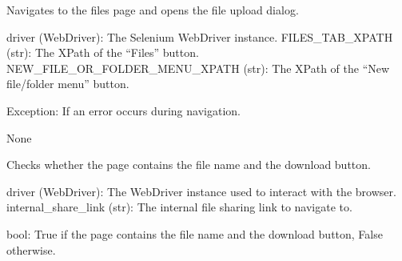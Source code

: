 \documentclass[letterpaper,10pt,english]{sphinxmanual}
\begin{document}

\begin{fulllineitems}
\label{\detokenize{utils:utils.file_management.goto_files}}
\pysigstartsignatures
{}
\pysigstopsignatures
\sphinxAtStartPar
Navigates to the files page and opens the file upload dialog.
\begin{description}
\sphinxAtStartPar
driver (WebDriver): The Selenium WebDriver instance.
FILES\_TAB\_XPATH (str): The XPath of the “Files” button.
NEW\_FILE\_OR\_FOLDER\_MENU\_XPATH (str): The XPath of the “New file/folder menu” button.

\sphinxAtStartPar
Exception: If an error occurs during navigation.

\sphinxAtStartPar
None

\end{description}

\end{fulllineitems}


\begin{fulllineitems}
\label{\detokenize{utils:utils.file_management.ifLogin_delete_cookies}}
\pysigstartsignatures
{}
\pysigstopsignatures
\sphinxAtStartPar
Checks whether the page contains the file name and the download button.
\begin{description}
\sphinxAtStartPar
driver (WebDriver): The WebDriver instance used to interact with the browser.
internal\_share\_link (str): The internal file sharing link to navigate to.

\sphinxAtStartPar
bool: True if the page contains the file name and the download button, False otherwise.

\end{description}

\end{fulllineitems}
\end{document}
